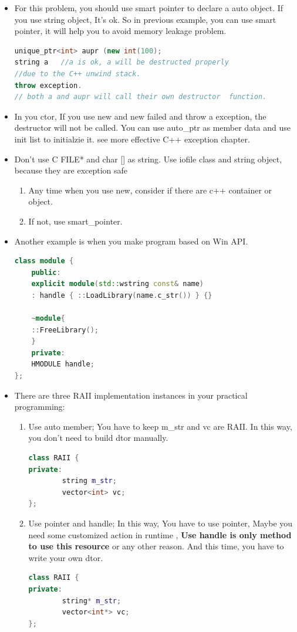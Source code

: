 \documentclass[a4paper,11pt,twoside]{book}
\begin{document}
\begin{itemize}
	\item For this problem, you should use smart pointer to declare a auto object.  If you use string object, It's ok.  So in previous example,  you can use smart pointer, it will help you to avoid memory leakage problem.
\begin{lstlisting}[frame=single, language=c++]
unique_ptr<int> aupr (new int(100);
string a   //a is ok, a will be destructed properly
//due to the C++ unwind stack.
throw exception.
// both a and aupr will call their own destructor  function.
\end{lstlisting}
	
	\item In you ctor, If you use new and new failed and throw a exception, the destructor will not be called. You can use auto\_ptr as member data and use init list to initialzie it. see  more effective C++ exception chapter.
	
	\item Don't use C FILE* and char [] as string. Use iofile class and string object, because they are exception safe
	\begin{enumerate}
		\item Any time when you use new, consider if there are c++ container or object.
		\item If not, use smart\_pointer.
	\end{enumerate}
	
\item Another example is when you make program based on Win API.
\begin{lstlisting}[frame=single, language=c++]
class module {
	public:
	explicit module(std::wstring const& name)
	: handle { ::LoadLibrary(name.c_str()) } {}
	
	~module{
	::FreeLibrary();
	}
	private:
	HMODULE handle;
};
	\end{lstlisting}
	
	\item There are three RAII implementation instances in your practical programming:
	\begin{enumerate}
		\item Use auto member; You have to keep m\_str and vc are RAII.  In this way, you don't need to build dtor manually.
\begin{lstlisting}[frame=single, language=c++]
class RAII {
private:
		string m_str;
		vector<int> vc;
};
		\end{lstlisting}
		
		\item Use pointer and handle; In this way, You have to use pointer, Maybe you need some customized action in runtime , \textbf{Use handle is only method to use this resource} or any other reason. And this time, you have to write your own dtor.
\begin{lstlisting}[frame=single, language=c++]
class RAII {
private:
		string* m_str;
		vector<int*> vc;
};
\end{lstlisting}
		

\end{enumerate}
\end{itemize}
\end{document}
